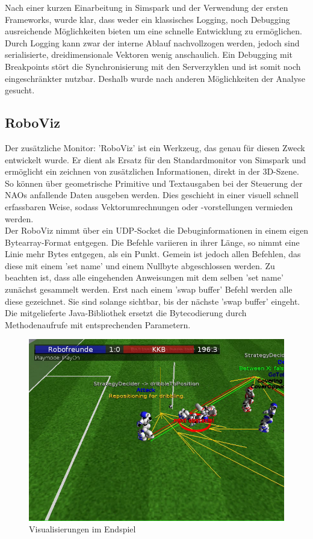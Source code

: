 Nach einer kurzen Einarbeitung in Simspark und der Verwendung der ersten Frameworks, wurde klar, dass weder ein klassisches Logging, noch Debugging ausreichende Möglichkeiten bieten um eine schnelle Entwicklung zu ermöglichen. Durch Logging kann zwar der interne Ablauf nachvollzogen werden, jedoch sind serialisierte, dreidimensionale Vektoren wenig anschaulich.
Ein Debugging mit Breakpoints stört die Synchronisierung mit den Serverzyklen und ist somit noch eingeschränkter nutzbar. Deshalb wurde nach anderen Möglichkeiten der Analyse gesucht.

\subsection{RoboViz}
\label{subsec:RoboViz}
Der zusätzliche Monitor: 'RoboViz' ist ein Werkzeug, das genau für diesen Zweck entwickelt wurde. Er dient als Ersatz für den Standardmonitor von Simspark und ermöglicht ein zeichnen von zusätzlichen Informationen, direkt in der 3D-Szene. So können über geometrische Primitive und Textausgaben bei der Steuerung der NAOs anfallende Daten ausgeben werden. Dies geschieht in einer visuell schnell erfassbaren Weise, sodass Vektorumrechnungen oder -vorstellungen vermieden werden.\\

Der RoboViz nimmt über ein UDP-Socket die Debuginformationen in einem eigen Bytearray-Format entgegen. Die Befehle variieren in ihrer Länge, so nimmt eine Linie mehr Bytes entgegen, als ein Punkt. Gemein ist jedoch allen Befehlen, das diese mit einem 'set name' und einem Nullbyte abgeschlossen werden. Zu beachten ist, dass alle eingehenden Anweisungen mit dem selben 'set name' zunächst gesammelt werden. Erst nach einem 'swap buffer' Befehl werden alle diese gezeichnet. Sie sind solange sichtbar, bis der nächste 'swap buffer' eingeht.\\
Die mitgelieferte Java-Bibliothek ersetzt die Bytecodierung durch Methodenaufrufe mit entsprechenden Parametern.

\begin{figure}[H]
	\centering
	\includegraphics[width=\ScaleIfNeeded]{Grafiken/RoboViz/RoboVizzingToDaMax}
	\caption{Visualisierungen im Endspiel}
	\label{fig:roboviz-endgame}
\end{figure}


